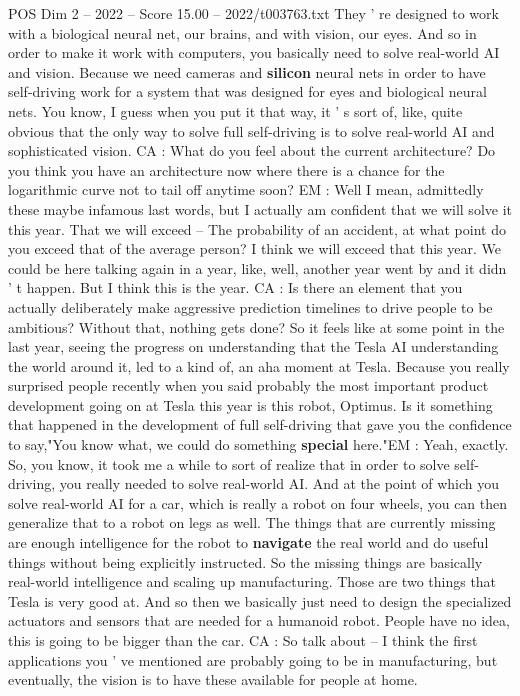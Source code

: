 \begin{textsample}{POS Dim 2 – 2022 – Score 15.00 – 2022/t003763.txt}
They ' re designed to work with a biological neural net, our brains, and with vision, our eyes.
And so in order to make it work with computers, you basically need to solve real-world AI and vision.
Because we need cameras and \textbf{silicon} neural nets in order to have self-driving work for a system that was designed for eyes and biological neural nets.
You know, I guess when you put it that way, it ' s sort of, like, quite obvious that the only way to solve full self-driving is to solve real-world AI and sophisticated vision.
CA : What do you feel about the current architecture?
Do you think you have an architecture now where there is a chance for the logarithmic curve not to tail off anytime soon?
EM : Well I mean, admittedly these maybe infamous last words, but I actually am confident that we will solve it this year.
That we will exceed -- The probability of an accident, at what point do you exceed that of the average person?
I think we will exceed that this year.
We could be here talking again in a year, like, well, another year went by and it didn ' t happen.
But I think this is the year.
CA : Is there an element that you actually deliberately make aggressive prediction timelines to drive people to be ambitious?
Without that, nothing gets done?
So it feels like at some point in the last year, seeing the progress on understanding that the Tesla AI understanding the world around it, led to a kind of, an aha moment at Tesla.
Because you really surprised people recently when you said probably the most important product development going on at Tesla this year is this robot, Optimus.
Is it something that happened in the development of full self-driving that gave you the confidence to say,"You know what, we could do something \textbf{special} here."EM : Yeah, exactly.
So, you know, it took me a while to sort of realize that in order to solve self-driving, you really needed to solve real-world AI.
And at the point of which you solve real-world AI for a car, which is really a robot on four wheels, you can then generalize that to a robot on legs as well.
The things that are currently missing are enough intelligence for the robot to \textbf{navigate} the real world and do useful things without being explicitly instructed.
So the missing things are basically real-world intelligence and scaling up manufacturing.
Those are two things that Tesla is very good at.
And so then we basically just need to design the specialized actuators and sensors that are needed for a humanoid robot.
People have no idea, this is going to be bigger than the car.
CA : So talk about -- I think the first applications you ' ve mentioned are probably going to be in manufacturing, but eventually, the vision is to have these available for people at home.

\end{textsample}
